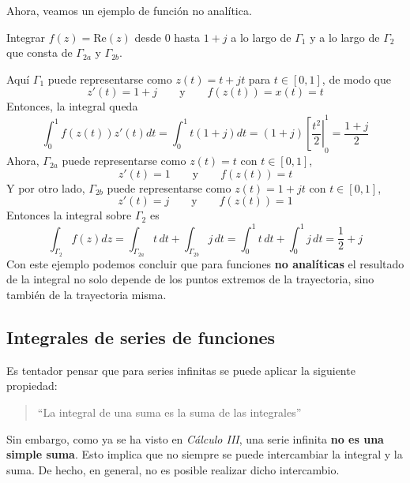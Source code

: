 Ahora, veamos un ejemplo de función no analítica. 
\begin{example}
  Integrar $f(z) = \text{Re}(z)$ desde $0$ hasta $1+j$ a lo largo de $\Gamma_1$ y a lo largo de $\Gamma_2$ que consta de $\Gamma_{2a}$ y $\Gamma_{2b}$.
  \begin{figure}[ht]
    \centering
  \end{figure}
  Aquí $\Gamma_1$ puede representarse como $z(t)=t+jt$ para $t\in[0,1]$, de modo que
  \[
    z'(t) = 1+j \qquad \text{y}\qquad f(z(t)) = x(t) = t 
  \]
  Entonces, la integral queda
  \[
    \int_0^1 f(z(t))z'(t)dt = \int_0^1 t(1+j)dt = (1+j) \left[\frac{t^2}{2}\right\rvert_0^1 = \frac{1+j}{2} 
  \]
  Ahora, $\Gamma_{2a}$ puede representarse como $z(t)=t$ con $t\in[0,1]$,
  \[
    z'(t)=1 \qquad \text{y} \qquad f(z(t))=t
  \]
  Y por otro lado, $\Gamma_{2b}$ puede representarse como $z(t)=1+jt$ con $t\in[0,1]$,
  \[
    z'(t)=j \qquad \text{y} \qquad f(z(t))=1
  \]
  Entonces la integral sobre $\Gamma_2$ es 
  \[
    \int_{\Gamma_2} f(z)dz = \int_{\Gamma_{2a}} t\,dt + \int_{\Gamma_{2b}} j\,dt = \int_0^1 t \,dt + \int_0^1 j\,dt = \frac{1}{2}+j
  \]
  Con este ejemplo podemos concluir que para funciones \textbf{no analíticas} el resultado de la integral no solo depende de los puntos extremos de la trayectoria, sino también de la trayectoria misma.
\end{example}

\subsection{Integrales de series de funciones}

Es tentador pensar que para series infinitas se puede aplicar la siguiente propiedad:
\begin{quote}
  \centering
  ``La integral de una suma es la suma de las integrales''
\end{quote}
Sin embargo, como ya se ha visto en \textit{Cálculo III}, una serie infinita \textbf{no es una simple suma}. Esto implica que no siempre se puede intercambiar la integral y la suma. De hecho, en general, no es posible realizar dicho intercambio.

